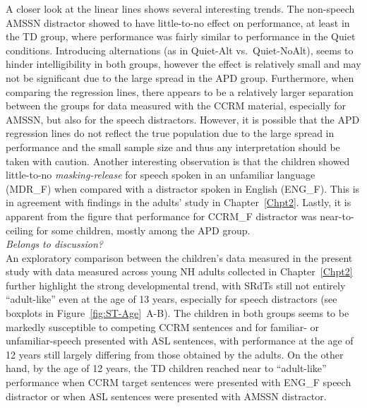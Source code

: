 \documentclass[a4paper, twoside]{templates/ociamthesis}
\begin{document}
A closer look at the linear lines shows several interesting trends. The non-speech AMSSN distractor showed to have little-to-no effect on performance, at least in the TD group, where performance was fairly similar to performance in the Quiet conditions. Introducing alternations (as in Quiet-Alt vs.~Quiet-NoAlt), seems to hinder intelligibility in both groups, however the effect is relatively small and may not be significant due to the large spread in the APD group. Furthermore, when comparing the regression lines, there appears to be a relatively larger separation between the groups for data measured with the CCRM material, especially for AMSSN, but also for the speech distractors. However, it is possible that the APD regression lines do not reflect the true population due to the large spread in performance and the small sample size and thus any interpretation should be taken with caution. Another interesting observation is that the children showed little-to-no \emph{masking-release} for speech spoken in an unfamiliar language (MDR\_F) when compared with a distractor spoken in English (ENG\_F). This is in agreement with findings in the adults' study in Chapter~\ref{Chpt2}. Lastly, it is apparent from the figure that performance for CCRM\_F distractor was near-to-ceiling for some children, mostly among the APD group.\\

\colorbox[HTML]{CCCCFF}{\emph{Belongs to discussion?}}\\
An exploratory comparison between the children's data measured in the present study with data measured across young NH adults collected in Chapter~\ref{Chpt2} further highlight the strong developmental trend, with SRdTs still not entirely ``adult-like'' even at the age of 13 years, especially for speech distractors (see boxplots in Figure~\ref{fig:ST-Age}~A-B). The children in both groups seems to be markedly susceptible to competing CCRM sentences and for familiar- or unfamiliar-speech presented with ASL sentences, with performance at the age of 12 years still largely differing from those obtained by the adults. On the other hand, by the age of 12 years, the TD children reached near to ``adult-like'' performance when CCRM target sentences were presented with ENG\_F speech distractor or when ASL sentences were presented with AMSSN distractor.\\
\end{document}
